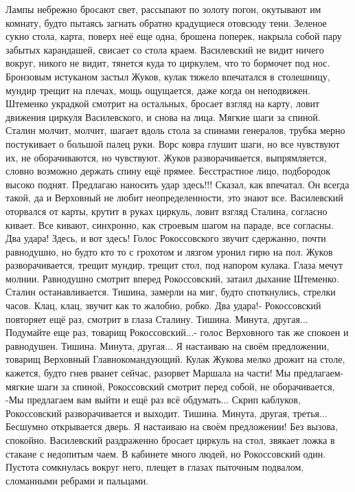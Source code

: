 Лампы небрежно бросают свет, рассыпают по золоту погон, окутывают им комнату, будто пытаясь загнать обратно крадущиеся отовсюду тени.
Зеленое сукно стола, карта, поверх неё еще одна, брошена поперек, накрыла собой пару забытых карандашей, свисает со стола краем.
Василевский не видит ничего вокруг, никого не видит, тянется куда то циркулем, что то бормочет под нос.
Бронзовым истуканом застыл Жуков, кулак тяжело впечатался в столешницу, мундир трещит на плечах, мощь ощущается, даже когда он неподвижен.
Штеменко украдкой смотрит на остальных, бросает взгляд на карту, ловит движения циркуля Василевского, и снова на лица.
Мягкие шаги за спиной.
Сталин молчит, молчит, шагает вдоль стола за спинами генералов, трубка мерно постукивает о большой палец руки.
Ворс ковра глушит шаги, но все чувствуют их, не оборачиваются, но чувствуют.
Жуков разворачивается, выпрямляется, словно возможно держать спину ещё прямее.
Бесстрастное лицо, подбородок высоко поднят.
Предлагаю наносить удар здесь!!!
Сказал, как впечатал.
Он всегда такой, да и Верховный не любит неопределенности, это знают все.
Василевский оторвался от карты, крутит в руках циркуль, ловит взгляд Сталина, согласно кивает.
Все кивают, синхронно, как строевым шагом на параде, все согласны.
Два удара!
Здесь, и вот здесь!
Голос Рокоссовского звучит сдержанно, почти равнодушно, но будто кто то с грохотом и лязгом уронил гирю на пол.
Жуков разворачивается, трещит мундир, трещит стол, под напором кулака.
Глаза мечут молнии.
Равнодушно смотрит вперед Рокоссовский, затаил дыхание Штеменко.
Сталин останавливается.
Тишина, замерли на миг, будто споткнулись, стрелки часов.
Клац, клац, звучит как то жалобно, робко.
Два удара!- Рокоссовский повторяет ещё раз, смотрит в глаза Сталину.
Тишина.
Минута, другая...
Подумайте еще раз, товарищ Рокоссовский...- голос Верховного так же спокоен и равнодушен.
Тишина.
Минута, другая...
Я настаиваю на своём предложении, товарищ Верховный Главнокомандующий.
Кулак Жукова мелко дрожит на столе, кажется, будто гнев рванет сейчас, разорвет Маршала на части!
Мы предлагаем- мягкие шаги за спиной, Рокоссовский смотрит перед собой, не оборачивается, -Мы предлагаем вам выйти и ещё раз всё обдумать...
Скрип каблуков, Рокоссовский разворачивается и выходит.
Тишина.
Минута, другая, третья...
Бесшумно открывается дверь.
Я настаиваю на своём предложении!
Без вызова, спокойно.
Василевский раздраженно бросает циркуль на стол, звякает ложка в стакане с недопитым чаем.
В кабинете много людей, но Рокоссовский один.
Пустота сомкнулась вокруг него, плещет в глазах пыточным подвалом, сломанными ребрами и пальцами.
